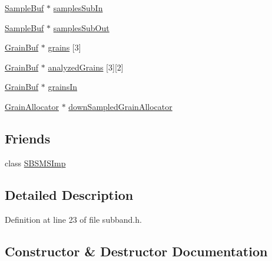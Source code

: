 \begin{DoxyCompactItemize}
\item 
\hyperlink{namespace__sbsms___a8cd0992a16c2cc5448b63d446239c196}{Sample\+Buf} $\ast$ \hyperlink{class__sbsms___1_1_sub_band_a177eddfed6a09e6ebe72a15f436ead14}{samples\+Sub\+In}
\item 
\hyperlink{namespace__sbsms___a8cd0992a16c2cc5448b63d446239c196}{Sample\+Buf} $\ast$ \hyperlink{class__sbsms___1_1_sub_band_adf2de2663db8f6552337ae52ec4bff46}{samples\+Sub\+Out}
\item 
\hyperlink{class__sbsms___1_1_grain_buf}{Grain\+Buf} $\ast$ \hyperlink{class__sbsms___1_1_sub_band_a546b82216d3274993456e5089d8f74ec}{grains} \mbox{[}3\mbox{]}
\item 
\hyperlink{class__sbsms___1_1_grain_buf}{Grain\+Buf} $\ast$ \hyperlink{class__sbsms___1_1_sub_band_a6b1b070cda1ea01bf08107b700558b02}{analyzed\+Grains} \mbox{[}3\mbox{]}\mbox{[}2\mbox{]}
\item 
\hyperlink{class__sbsms___1_1_grain_buf}{Grain\+Buf} $\ast$ \hyperlink{class__sbsms___1_1_sub_band_a3967afa5622ee079193e29e430d1d901}{grains\+In}
\item 
\hyperlink{class__sbsms___1_1_grain_allocator}{Grain\+Allocator} $\ast$ \hyperlink{class__sbsms___1_1_sub_band_a8ad030b3bc67592a284eaadcd9a929dd}{down\+Sampled\+Grain\+Allocator}
\end{DoxyCompactItemize}
\subsection*{Friends}
\begin{DoxyCompactItemize}
\item 
class \hyperlink{class__sbsms___1_1_sub_band_ae4bb3357a0671b046cff2cadf6c5ab2b}{S\+B\+S\+M\+S\+Imp}
\end{DoxyCompactItemize}


\subsection{Detailed Description}


Definition at line 23 of file subband.\+h.



\subsection{Constructor \& Destructor Documentation}
